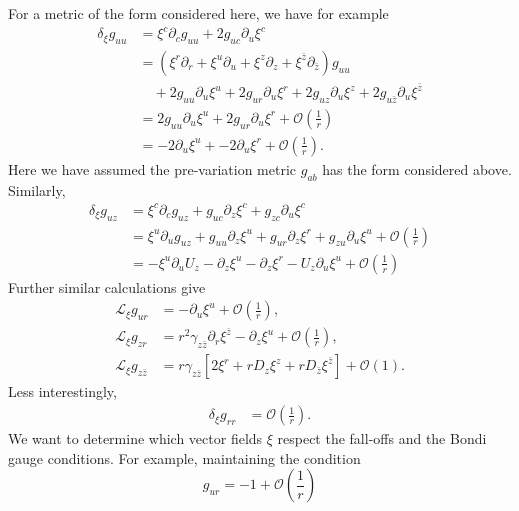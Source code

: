 \documentclass[11pt,letterpaper]{article}
\newcommand{\LP}{\left(}
\newcommand{\RP}{\right)}
\newcommand{\mc}[1]{\mathcal{#1}}
\newcommand{\D}{\partial}
\begin{document}
For a metric of the form considered here, we have for example \begin{equation}
\begin{aligned}
\delta_\xi g_{uu} & = \xi^c \D_c g_{uu} + 2 g_{uc} \D_u \xi^c \\
& = \LP \xi^r \D_r + \xi^u \D_u + \xi^z \D_z + \xi^{\bar{z}} \D_{\bar{z}} \RP g_{uu} \\
& \quad + 2 g_{uu} \D_u \xi^u + 2 g_{ur} \D_u \xi^r + 2 g_{uz} \D_u \xi^z + 2 g_{u \bar{z}} \D_u \xi^{\bar{z}} \\
& = 2 g_{uu} \D_u \xi^u + 2 g_{ur} \D_u \xi^r + \mc{O} \LP \frac{1}{r} \RP \\
& = - 2 \D_u \xi^u + - 2 \D_u \xi^r + \mc{O} \LP \frac{1}{r} \RP.
\end{aligned}
\end{equation}
Here we have assumed the pre-variation metric $g_{ab}$ has the form considered above. Similarly, \begin{equation}
\begin{aligned}
\delta_\xi g_{uz} & = \xi^c \D_c g_{uz} + g_{uc} \D_z \xi^c + g_{zc} \D_u \xi^c \\
& = \xi^u \D_u g_{uz} + g_{uu} \D_z \xi^u + g_{ur} \D_z \xi^r + g_{zu} \D_u \xi^u + \mc{O} \LP \frac{1}{r} \RP \\
& = - \xi^u \D_u U_z - \D_z \xi^u - \D_z \xi^r - U_z \D_u \xi^u + \mc{O} \LP \frac{1}{r} \RP
\end{aligned}
\end{equation}
Further similar calculations give \begin{equation}
\begin{aligned}
\mc{L}_\xi g_{ur} & = - \D_u \xi^u + \mc{O} \LP \frac{1}{r} \RP, \\
\mc{L}_\xi g_{zr} & = r^2 \gamma_{z \bar{z}} \D_r \xi^{\bar{z}} - \D_z \xi^u + \mc{O} \LP \frac{1}{r} \RP, \\
\mc{L}_\xi g_{z \bar{z}} & = r \gamma_{z \bar{z}} \left[ 2 \xi^r + r D_z \xi^z + r D_{\bar{z}} \xi^{\bar{z}} \right] + \mc{O}(1).
\end{aligned}
\end{equation}
Less interestingly, \begin{equation}
\begin{aligned}
\delta_\xi g_{rr} & = \mc{O} \LP \frac{1}{r} \RP.
\end{aligned}
\end{equation}
We want to determine which vector fields $\xi$ respect the fall-offs and the Bondi gauge conditions. For example, maintaining the condition \begin{equation}
g_{ur} = -1 + \mc{O} \LP \frac{1}{r} \RP
\end{equation}
\end{document}

